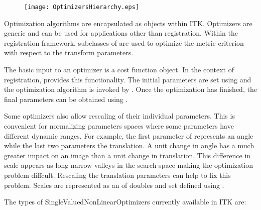


\begin{figure}
\center
\texttt{[image: OptimizersHierarchy.eps]}
\label{fig:OptimizersHierarchy}
\end{figure}

Optimization algorithms are encapsulated as  objects
within ITK. Optimizers are generic and can be used for applications other than
registration.  Within the registration framework, subclasses of
 are used to optimize the metric
criterion with respect to the transform parameters.


The basic input to an optimizer is a cost function object. In the context
of registration,  provides this functionality.
The initial parameters are set using  and
the optimization algorithm is invoked by .
Once the optimization has finished, the final parameters can be obtained
using .

Some optimizers also allow rescaling of their individual parameters. This
is convenient for normalizing parameters spaces where some parameters
have different dynamic ranges. For example, the first parameter of
 represents an angle while the last two parameters
the translation. A unit change in angle has a much greater impact on
an image than a unit change in translation. This difference in scale appears
as long narrow valleys in the search space making the optimization problem
diffcult. Rescaling the translation parameters can help to fix this problem.
Scales are represented as an  of doubles and set defined using
.

The types of SingleValuedNonLinearOptimizers currently available
in ITK are:


